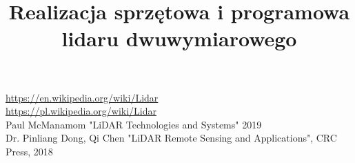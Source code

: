 \documentclass{thesis}
\title{Realizacja sprzętowa i programowa lidaru dwuwymiarowego}
\begin{document}
\maketitle
\newpage
\tableofcontents
\newpage



\begin{thebibliography}{0}
\end{thebibliography}
\url{https://en.wikipedia.org/wiki/Lidar}\\
\url{https://pl.wikipedia.org/wiki/Lidar}\\
Paul McManamom "LiDAR Technologies and Systems" 2019\\
Dr. Pinliang Dong, Qi Chen "LiDAR Remote Sensing and Applications", CRC Press, 2018\\
\end{document}
